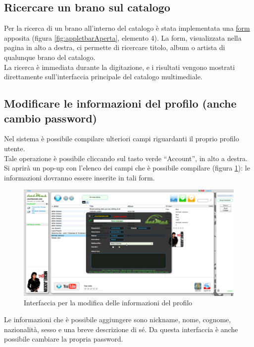 \subsection{Ricercare un brano sul catalogo}
\label{cap:ricerca}
Per la ricerca di un brano all'interno del catalogo \`e stata implementata una
\underline{form} apposita (figura \ref{fig:appletbarAperta}, elemento 4). La
form, visualizzata nella pagina in alto a destra, ci permette di ricercare
titolo, album o artista di qualunque brano del catalogo.\\ 
La ricerca \`e immediata durante la digitazione, e i risultati vengono mostrati
direttamente sull'interfaccia principale del catalogo multimediale.

\subsection{Modificare le informazioni del profilo (anche cambio password)}

Nel sistema  \`e possibile compilare ulteriori campi riguardanti il
proprio profilo utente.\\
Tale operazione \`e possibile cliccando sul tasto verde ``Account'', in alto a
destra.
Si aprir\`a un pop-up con l'elenco dei campi che \`e possibile
compilare (figura \ref{fig:profilo}): le informazioni dovranno essere inserite
in tali form.\\
\begin{figure}[!htbp]
  \centering
  \includegraphics[width=14cm]{img/MU/profile_view.png}
\caption{Interfaccia per la modifica delle informazioni del profilo}
\label{fig:profilo}
\end{figure}

Le informazioni che \`e possibile aggiungere sono nickname, nome, cognome,
nazionalit\`a, sesso e una breve descrizione di s\'e. Da questa interfaccia \`e
anche possibile cambiare la propria password.\\

